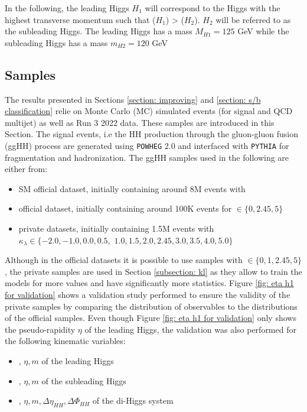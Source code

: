 In the following, the leading Higgs $H_1$ will correspond to the Higgs with the highest transverse momentum such that \pt($H_1$) > \pt($H_2$). $H_2$ will be referred to as the subleading Higgs. The leading Higgs has a mass $M_{H1}=125$ GeV while the subleading Higgs has a mass $m_{H2}=120$ GeV

\subsection{Samples} \label{subsection: samples}

The results presented in Sections \ref{section: improving} and \ref{section: s/b classification} relie on Monte Carlo (MC) simulated events (for signal and QCD multijet) as well as Run 3 2022 data. These samples are introduced in this Section. The signal events, i.e the HH production through the gluon-gluon fusion (ggHH) process are generated using \texttt{POWHEG} 2.0 and interfaced with \texttt{PYTHIA} for fragmentation and hadronization. The ggHH samples used in the following are either from:
\begin{itemize}
    \item SM official dataset, initially containing around 8M events with 
    \item \kl official dataset, initially containing around 100K events for \kl $\in \{0,2.45,5\}$
    \item \kl private datasets, initially containing 1.5M events with $\kappa_\lambda 
\in \{-2.0, -1.0, 0.0, 0.5,$ $ 1.0, 1.5, 2.0, 2.45, 3.0, 3.5, 4.0, 5.0\} $
\end{itemize}

Although in the official datasets it is possible to use samples with \kl $\in \{0,1,2.45,5\}$, the private samples are used in Section \ref{subsection: kl} as they allow to train the models for more \kl values and have significantly more statistics. Figure \ref{fig: eta h1 for validation} shows a validation study performed to ensure the validity of the private samples by comparing the distribution of observables to the distributions of the official samples. Even though Figure \ref{fig: eta h1 for validation} only shows the pseudo-rapidity $\eta$ of the leading Higgs, the validation was also performed for the following kinematic variables:

\begin{itemize}
    \item \pt, $\eta, m $ of the leading Higgs
    \item \pt, $\eta, m $ of the subleading Higgs
    \item \pt, $\eta, m, \Delta \eta_{HH}, \Delta \Phi_{HH} $ of the di-Higgs system
\end{itemize}


